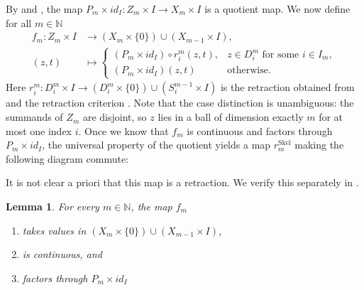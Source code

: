 \documentclass[11pt, a4paper, english]{article}
\theoremstyle{plain}
\newtheorem{lemma}[theorem]{Lemma}
\theoremstyle{definition}
\theoremstyle{remark}
\numberwithin{equation}{section}
\numberwithin{theorem}{section}
\begin{document}
By  and , the map $P_m \times id_I \colon Z_m \times I \to X_m \times I$ is a quotient map. We now define for all $m \in \mathbb{N}$
\begin{align*} 
f_m : Z_m \times I &\to (X_m \times \{0\}) \cup (X_{m-1} \times I),  \\
    (z,t) &\mapsto
    \begin{cases}
    (P_m \times id_I) \circ r_i^m (z,t), & z \in D_i^m \text{ for some } i \in I_m,\\
    (P_m \times id_I) (z,t) & \text{otherwise. }  
    \end{cases}
\end{align*}
Here $r_i^m \colon D_i^m \times I \to (D_i^m \times \{0\}) \cup (S_i^{m-1} \times I)$ is the retraction obtained from  and the retraction criterion . Note that the case distinction is unambiguous: the summands of $Z_m$ are disjoint, so $z$ lies in a ball of dimension exactly $m$ for at most one index $i$. Once we know that $f_m$ is continuous and factors through $P_m \times id_I$, the universal property of the quotient yields a map $r^{\mathrm{Skel}}_m$ making the following diagram commute:
\begin{center}
\end{center}

It is not clear a priori that this map is a retraction. We verify this separately in .

\begin{lemma} \label{lem:fm}
    For every $m \in \mathbb{N}$, the map $f_m$  
    \begin{enumerate}
    \renewcommand{\labelenumi}{(\roman{enumi})}
    \item takes values in $(X_m \times \{0\}) \cup (X_{m-1} \times I)$,
    \item is continuous, and
    \item factors through $P_m \times id_I$
    \end{enumerate}
\end{lemma}
\end{document}
